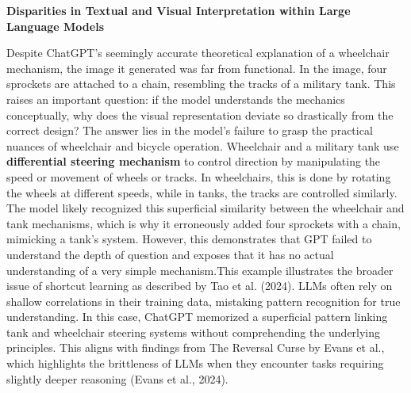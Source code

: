\documentclass[11pt]{scrartcl}
\begin{document}
\begin{Large}
\textbf{Disparities in Textual and Visual Interpretation within Large Language Models}
\end{Large}
Despite ChatGPT’s seemingly accurate theoretical explanation of a wheelchair mechanism, the image it generated was far from functional. In the image, four sprockets are attached to a chain, resembling the tracks of a military tank. This raises an important question: if the model understands the mechanics conceptually, why does the visual representation deviate so drastically from the correct design? The answer lies in the model's failure to grasp the practical nuances of wheelchair and bicycle operation. Wheelchair and a military tank use \textbf{differential steering mechanism} to control direction by manipulating the speed or movement of wheels or tracks. In wheelchairs, this is done by rotating the wheels at different speeds, while in tanks, the tracks are controlled similarly. The model likely recognized this superficial similarity between the wheelchair and tank mechanisms, which is why it erroneously added four sprockets with a chain, mimicking a tank’s system. However, this demonstrates that GPT failed to understand the depth of question and exposes that it has no actual understanding of a very simple mechanism.This example illustrates the broader issue of shortcut learning as described by Tao et al. (2024)\cite{ref5}. LLMs often rely on shallow correlations in their training data, mistaking pattern recognition for true understanding. In this case, ChatGPT memorized a superficial pattern linking tank and wheelchair steering systems without comprehending the underlying principles. This aligns with findings from The Reversal Curse by Evans et al., which highlights the brittleness of LLMs when they encounter tasks requiring slightly deeper reasoning (Evans et al., 2024)\cite{ref1}.
\end{document}
